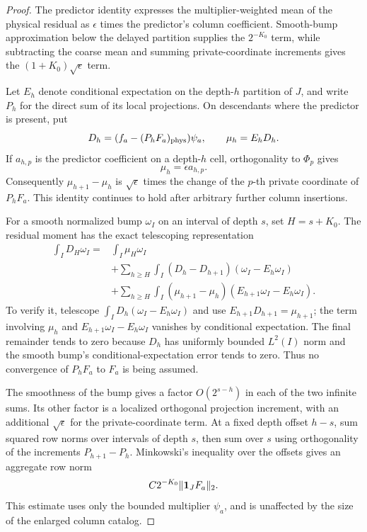 \begin{proof}
The predictor identity expresses the multiplier-weighted mean of the
physical residual as $\epsilon$ times the predictor's column
coefficient.  Smooth-bump approximation below the delayed partition
supplies the $2^{-K_0}$ term, while subtracting the coarse mean and
summing private-coordinate increments gives the
$(1+K_0)\sqrt\epsilon$ term.

Let $E_h$ denote conditional expectation on the depth-$h$ partition
of $J$, and write $P_h$ for the direct sum of its local projections.
On descendants where the predictor is present, put
\[
 D_h=(f_a-(P_hF_a)_{\mathrm{phys}})\psi_a,
 \qquad \mu_h=E_hD_h.
\]
If $a_{h,p}$ is the predictor coefficient on a depth-$h$ cell,
orthogonality to $\Phi_p$ gives
\[
 \mu_h=\epsilon a_{h,p}.
\]
Consequently $\mu_{h+1}-\mu_h$ is $\sqrt\epsilon$ times the change
of the $p$-th private coordinate of $P_hF_a$.  This identity continues
to hold after arbitrary further column insertions.

For a smooth normalized bump $\omega_I$ on an interval of depth $s$,
set $H=s+K_0$.  The residual moment has the exact telescoping
representation
\[
\begin{split}
 \int_I D_H\omega_I
  ={}&\int_I\mu_H\omega_I\\
   &+\sum_{h\ge H}\int_I(D_h-D_{h+1})(\omega_I-E_h\omega_I)\\
   &+\sum_{h\ge H}\int_I(\mu_{h+1}-\mu_h)
                                  (E_{h+1}\omega_I-E_h\omega_I).
\end{split}
\]
To verify it, telescope
$\int_I D_h(\omega_I-E_h\omega_I)$ and use
$E_{h+1}D_{h+1}=\mu_{h+1}$; the term involving $\mu_h$ and
$E_{h+1}\omega_I-E_h\omega_I$ vanishes by conditional expectation.
The final remainder tends to zero because $D_h$ has uniformly bounded
$L^2(I)$ norm and the smooth bump's conditional-expectation error tends
to zero.  Thus no convergence of $P_hF_a$ to $F_a$ is being assumed.

The smoothness of the bump gives a factor $O(2^{s-h})$ in each of
the two infinite sums.  Its other factor is a localized orthogonal
projection increment, with an additional $\sqrt\epsilon$ for the
private-coordinate term.  At a fixed depth offset $h-s$, sum squared
row norms over intervals of depth $s$, then sum over $s$ using
orthogonality of the increments $P_{h+1}-P_h$.  Minkowski's inequality
over the offsets gives an aggregate row norm
\[
 C2^{-K_0}\|\mathbf 1_JF_a\|_2.
\]
This estimate uses only the bounded multiplier $\psi_a$, and is
unaffected by the size of the enlarged column catalog.


\end{proof}
